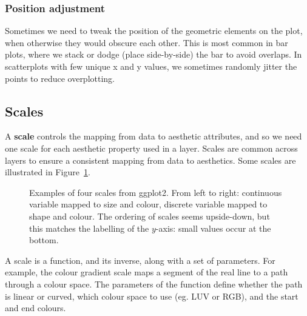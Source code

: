 \subsubsection{Position adjustment}

Sometimes we need to tweak the position of the geometric elements on the plot, when otherwise they would obscure each other.  This is most common in bar plots, where we stack or dodge (place side-by-side) the bar to avoid overlaps.  In scatterplots with few unique x and y values, we sometimes randomly jitter \citep{chambers:1983} the points to reduce overplotting.  

\subsection{Scales}\label{sec:scales}

A {\bf scale} controls the mapping from data to aesthetic attributes, and so we need one scale for each aesthetic property used in a layer.  Scales are common across layers to ensure a consistent mapping from data to aesthetics.  Some scales are illustrated in Figure~\ref{fig:scales}.

\begin{figure}[htbp]
  \centering
  \caption{Examples of four scales from ggplot2.  From left to right: continuous variable mapped to size and colour, discrete variable mapped to shape and colour.  The ordering of scales seems upside-down, but this matches the labelling of the $y$-axis: small values occur at the bottom.}
  \label{fig:scales}
\end{figure}



A scale is a function, and its inverse, along with a set of parameters.  For example, the colour gradient scale maps a segment of the real line to a path through a colour space.  The parameters of the function define whether the path is linear or curved, which colour space to use (eg. LUV or RGB), and the start and end colours.  

